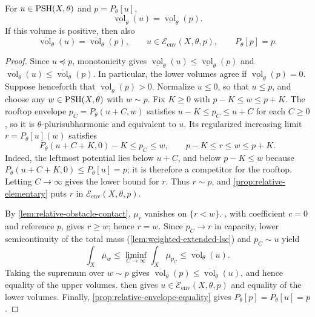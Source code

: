 \begin{theorem}\label{thm:ordinary-envelope-volumes}
For $u\in\mathrm{PSH}(X,\theta)$ and $p=P_\theta[u]$,
\[
 \underline{\operatorname{vol}}_\theta(u)
       =\underline{\operatorname{vol}}_\theta(p).
\]
If this volume is positive, then also
\[
 \overline{\operatorname{vol}}_\theta(u)
       =\overline{\operatorname{vol}}_\theta(p),\qquad
 u\in\mathcal E_{\mathrm{env}}(X,\theta,p),\qquad
 P_\theta[p]=p.
\]
\end{theorem}
\begin{proof}
Since $u\preceq p$, monotonicity gives $\underline{\operatorname{vol}}_\theta(u)\leq\underline{\operatorname{vol}}_\theta(p)$ and $\overline{\operatorname{vol}}_\theta(u)\leq\overline{\operatorname{vol}}_\theta(p)$. In particular, the lower volumes agree if $\underline{\operatorname{vol}}_\theta(p)=0$. Suppose henceforth that $\underline{\operatorname{vol}}_\theta(p)>0$. Normalize $u\leq0$, so that $u\leq p$, and choose any $w\in\mathrm{PSH}(X,\theta)$ with $w\sim p$. Fix $K\geq0$ with $p-K\leq w\leq p+K$. The rooftop envelope $p_C=P_\theta(u+C,w)$ satisfies $u-K\leq p_C\leq u+C$ for each $C\geq0$, so it is $\theta$-plurisubharmonic and equivalent to $u$. Its regularized increasing limit $r=P_\theta[u](w)$ satisfies
\[
 P_\theta(u+C+K,0)-K\leq p_C\leq w,
 \qquad p-K\leq r\leq w\leq p+K.
\]
Indeed, the leftmost potential lies below $u+C$, and below $p-K\leq w$ because $P_\theta(u+C+K,0)\leq P_\theta[u]=p$; it is therefore a competitor for the rooftop. Letting $C\to\infty$ gives the lower bound for $r$. Thus $r\sim p$, and \cref{prop:relative-elementary} puts $r$ in $\mathcal E_{\mathrm{env}}(X,\theta,p)$.

By \cref{lem:relative-obstacle-contact}, $\mu_r$ vanishes on $\{r<w\}$. , with coefficient $c=0$ and reference $p$, gives $r\geq w$; hence $r=w$. Since $p_C\to r$ in capacity, lower semicontinuity of the total mass (\cref{lem:weighted-extended-lsc}) and $p_C\sim u$ yield
\[
 \int_X\mu_w\leq\liminf_{C\to\infty}\int_X\mu_{p_C}
       \leq\overline{\operatorname{vol}}_\theta(u).
\]
Taking the supremum over $w\sim p$ gives $\overline{\operatorname{vol}}_\theta(p)\leq\overline{\operatorname{vol}}_\theta(u)$, and hence equality of the upper volumes.  then gives $u\in\mathcal E_{\mathrm{env}}(X,\theta,p)$ and equality of the lower volumes. Finally, \cref{prop:relative-envelope-equality} gives $P_\theta[p]=P_\theta[u]=p$.
\end{proof}

